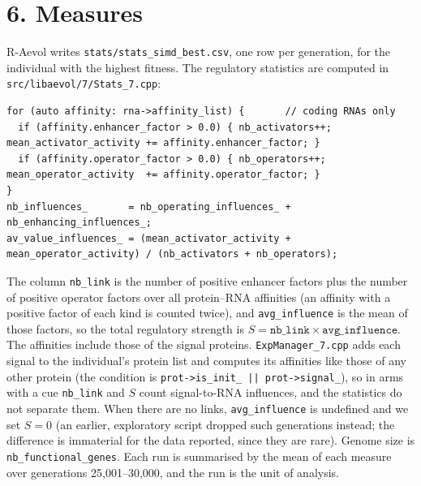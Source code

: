 \section*{6. Measures}
R-Aevol writes \texttt{stats/stats\_simd\_best.csv}, one row per generation, for
the individual with the highest fitness. The regulatory statistics are computed in
\texttt{src/libaevol/7/Stats\_7.cpp}:
\begin{lstlisting}
for (auto affinity: rna->affinity_list) {       // coding RNAs only
  if (affinity.enhancer_factor > 0.0) { nb_activators++; mean_activator_activity += affinity.enhancer_factor; }
  if (affinity.operator_factor > 0.0) { nb_operators++;  mean_operator_activity  += affinity.operator_factor; }
}
nb_influences_       = nb_operating_influences_ + nb_enhancing_influences_;
av_value_influences_ = (mean_activator_activity + mean_operator_activity) / (nb_activators + nb_operators);
\end{lstlisting}
The column \texttt{nb\_link} is the number of positive enhancer factors plus the number of positive operator factors over all protein--RNA affinities (an affinity with a positive factor of each kind is counted twice), and \texttt{avg\_influence} is the mean of those factors,
so the total regulatory strength is $S = \texttt{nb\_link}\times\texttt{avg\_influence}$.
The affinities include those of the signal proteins. \texttt{ExpManager\_7.cpp}
adds each signal to the individual's protein list and computes its affinities
like those of any other protein (the condition is
\texttt{prot->is\_init\_ || prot->signal\_}), so in arms with a cue
\texttt{nb\_link} and $S$ count signal-to-RNA influences, and the statistics do
not separate them. When
there are no links, \texttt{avg\_influence} is undefined and we set $S=0$ (an
earlier, exploratory script dropped such generations instead; the difference is
immaterial for the data reported, since they are rare). Genome size is
\texttt{nb\_functional\_genes}. Each run is summarised by the mean of each measure
over generations 25{,}001--30{,}000, and the run is the unit of analysis.

